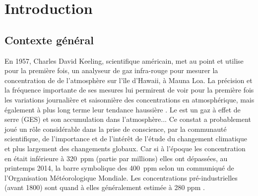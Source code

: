 
\chapter*{Introduction}
\newpage
\begin{linenumbers}


\section*{Contexte général}


En 1957, Charles David Keeling, scientifique américain, met au point et utilise pour la première fois, un analyseur de gaz infra-rouge pour mesurer la concentration de \COO de l'atmosphère sur l'île d'Hawaii, à Mauna Loa.
La précision et la fréquence importante de ses mesures lui permirent de voir pour la première fois les variations journalière et saisonnière des concentrations en \COO atmosphérique, mais également à plus long terme leur tendance haussière \cite{harris2010}.
Le \COO est un gaz à effet de serre (GES) et son accumulation dans l'atmosphère... 
Ce constat a probablement joué un rôle considérable dans la prise de conscience, par la communauté scientifique, de l'importance et de l'intérêt de l'étude du changement climatique et plus largement des changements globaux.
Car si à l'époque les concentration en \COO était inférieure à 320~ppm (partie par millions) elles ont dépassées, au printemps 2014, la barre symbolique des 400~ppm selon un communiqué de l'Organisation Météorologique Mondiale. Les concentrations pré-industrielles (avant 1800) sont quand à elles généralement estimée à 280 ppm \cite{Siegenthaler1987}.


\end{linenumbers}
